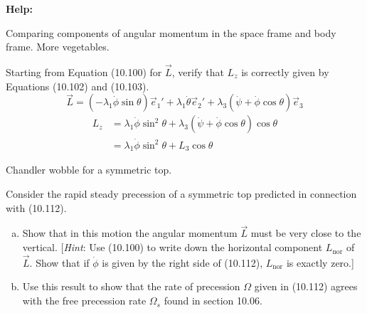 \documentclass[11pt,letterpaper,boxed]{../hmcpsetrhino}
\begin{document}
\textbf{Help:}

\begin{problem}[i]
Comparing components of angular momentum in the space frame and body frame. More vegetables.

\begin{problem}[10.49]
Starting from Equation (10.100) for $\vec L$, verify that $L_z$ is correctly given by Equations (10.102) and (10.103).\\
\[	\vec L = (-\lambda_1 \dot \phi \sin \theta) \vec e_1'  + \lambda_1 \dot \theta \vec e_2' + \lambda_3 (\dot \psi + \dot \phi \cos \theta) \vec e_3 \tag{10.100}\]
\begin{align*}
L_z &= \lambda_1 \dot \phi \sin^2 \theta + \lambda_3(\dot \psi + \dot \phi \cos \theta) \cos \theta \tag{10.102}\\
&= \lambda_1 \dot \phi \sin^2 \theta + L_3 \cos \theta \tag{10.103}
\end{align*}
\end{problem}
\end{problem}
\begin{solution}


\vfill
\end{solution}

\newpage 

\begin{problem}[ii]
Chandler wobble for a symmetric top.

\begin{problem}[10.52]
Consider the rapid steady precession of a symmetric top predicted in connection with (10.112).
\begin{enumerate}[(a)]
\item Show that in this motion the angular momentum $\vec L$ must be very close to the vertical. [\textit{Hint}: Use (10.100) to write down the horizontal component $L_{\text{nor}}$ of $\vec L$. Show that if $\dot \phi$ is given by the right side of (10.112), $L_{\text{nor}}$ is exactly zero.]

\item Use this result to show that the rate of precession $\Omega$ given in (10.112) agrees with the free precession rate $\Omega_s$ found in section 10.06.

\end{enumerate}
\end{problem}
\end{problem}
\begin{solution}


\vfill
\end{solution}
\end{document}
